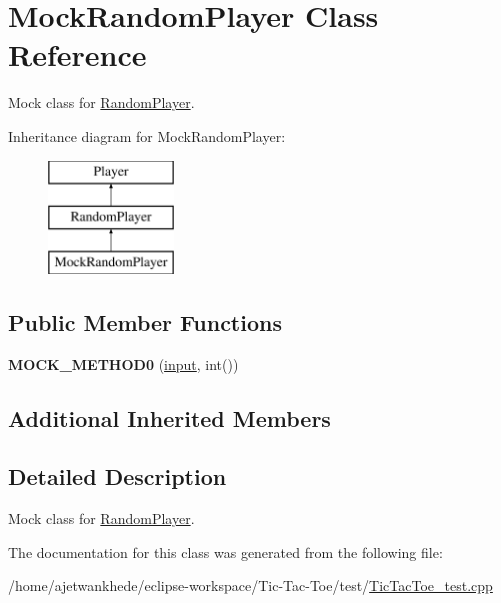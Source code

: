 \hypertarget{classMockRandomPlayer}{}\section{Mock\+Random\+Player Class Reference}
\label{classMockRandomPlayer}


Mock class for \mbox{\hyperlink{classRandomPlayer}{Random\+Player}}.  


Inheritance diagram for Mock\+Random\+Player\+:\begin{figure}[H]
\begin{center}
\leavevmode
\includegraphics[height=3.000000cm]{classMockRandomPlayer}
\end{center}
\end{figure}
\subsection*{Public Member Functions}
\begin{DoxyCompactItemize}
\item 
\mbox{\label{classMockRandomPlayer_a0b9c5397b7bd4a6e116b7b177abf1490}} 
{\bfseries M\+O\+C\+K\+\_\+\+M\+E\+T\+H\+O\+D0} (\mbox{\hyperlink{classRandomPlayer_a4b252647e976a08c1717d8db78bec23d}{input}}, int())
\end{DoxyCompactItemize}
\subsection*{Additional Inherited Members}


\subsection{Detailed Description}
Mock class for \mbox{\hyperlink{classRandomPlayer}{Random\+Player}}. 

The documentation for this class was generated from the following file\+:\begin{DoxyCompactItemize}
\item 
/home/ajetwankhede/eclipse-\/workspace/\+Tic-\/\+Tac-\/\+Toe/test/\mbox{\hyperlink{TicTacToe__test_8cpp}{Tic\+Tac\+Toe\+\_\+test.\+cpp}}\end{DoxyCompactItemize}
